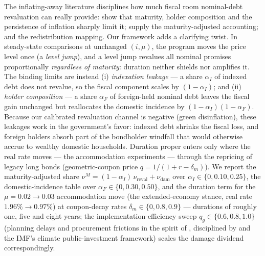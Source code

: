 \documentclass[12pt]{article}
\begin{document}
The inflating-away literature disciplines how much fiscal room nominal-debt
revaluation can really provide: \citet{hilscher2022} show that maturity,
holder composition and the persistence of inflation sharply limit it;
\citet{hallsargent2011} supply the maturity-adjusted accounting;
\citet{doepkeschneider2006} and \citet{auclert2019} the redistribution
mapping. Our framework adds a clarifying twist. In steady-state comparisons
at unchanged $(i,\mu)$, the program moves the price level once (a
\emph{level jump}), and a level jump revalues all nominal promises
proportionally \emph{regardless of maturity}: duration neither shields nor
amplifies it. The binding limits are instead (i) \emph{indexation leakage}
--- a share $\alpha_I$ of indexed debt does not revalue, so the fiscal
component scales by $(1-\alpha_I)$; and (ii) \emph{holder composition} ---
a share $\alpha_F$ of foreign-held nominal debt leaves the fiscal gain
unchanged but reallocates the domestic incidence by
$(1-\alpha_I)(1-\alpha_F)$. Because our calibrated revaluation channel is
negative (green disinflation), these leakages work in the
government's favor: indexed debt shrinks the fiscal loss, and foreign
holders absorb part of the bondholder windfall that would otherwise accrue
to wealthy domestic households. Duration proper enters only where the real
rate moves --- the accommodation experiments --- through the repricing of
legacy long bonds (geometric-coupon price $q = 1/(1+r-\delta_m)$). We
report the maturity-adjusted
share $\nu^{M} = (1-\alpha_I)\,\nu_{\mathrm{reval}} + \nu_{\mathrm{dam}}$
over $\alpha_I \in \{0, 0.10, 0.25\}$, the domestic-incidence table over
$\alpha_F \in \{0, 0.30, 0.50\}$, and the duration term for the
$\mu = 0.02 \to 0.03$ accommodation move (the extended-economy stance, real
rate $1.96\% \to 0.97\%$) at coupon-decay rates $\delta_m \in \{0, 0.8,
0.9\}$ --- durations of roughly one, five and eight years; the
implementation-efficiency sweep $q_g \in \{0.6, 0.8, 1.0\}$
(planning delays and procurement frictions in the spirit of
\citealp{leeperwalkeryang2010}, disciplined by \citealp{bomligthart2014}
and the IMF's climate public-investment framework) scales the damage
dividend correspondingly.
\end{document}
